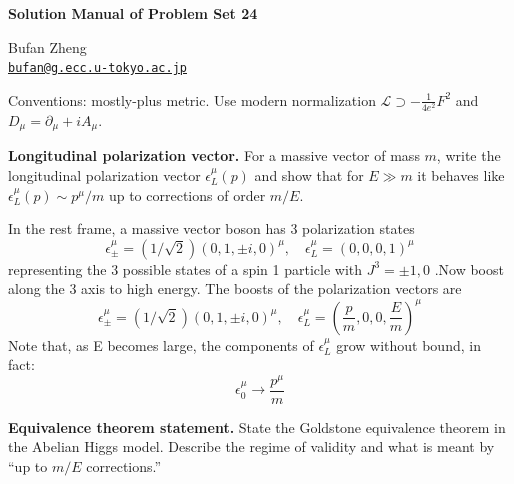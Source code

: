 \resetproblem
\begin{center}
    {\LARGE \textbf{Solution Manual of Problem Set 24} \par}
    \vspace{1em}
    {\large Bufan Zheng\\ \href{mailto:bufan@g.ecc.u-tokyo.ac.jp}{\texttt{bufan@g.ecc.u-tokyo.ac.jp}} \par}
\end{center}

\noindent Conventions: mostly-plus metric. Use modern normalization \(\mathcal{L}\supset-\frac{1}{4e^2}F^2\) and \(D_\mu=\partial_\mu+iA_\mu\).

\begin{problem}
    \textbf{Longitudinal polarization vector.} For a massive vector of mass \(m\), write the longitudinal polarization vector \(\epsilon_L^\mu(p)\) and show that for \(E\gg m\) it behaves like \(\epsilon_L^\mu(p)\sim p^\mu/m\) up to corrections of order \(m/E\).
\end{problem}
\begin{solution}[24.1]
	In the rest frame, a massive vector boson has 3 polarization states
	$$\epsilon_{\pm}^{\mu}=(1/\sqrt{2})(0,1,\pm i,0)^{\mu},\quad\epsilon_{L}^{\mu}=(0,0,0,1)^{\mu}$$
	representing the 3 possible states of a spin 1 particle with $J^3=\pm1,0$ .Now boost along the 3 axis to high energy. The boosts of
	the polarization vectors are
	$$\epsilon_{\pm}^{\mu}=(1/\sqrt{2})(0,1,\pm i,0)^{\mu},\quad\epsilon_L^\mu=(\frac{p}{m},0,0,\frac{E}{m})^\mu$$
	Note that, as E becomes large, the components of $\epsilon^\mu_L$ grow without bound, in fact:
	\[
	\boxed{\epsilon_0^\mu\to\frac{p^\mu}{m}}
	\]
\end{solution}
\begin{problem}
    \textbf{Equivalence theorem statement.} State the Goldstone equivalence theorem in the Abelian Higgs model. Describe the regime of validity and what is meant by “up to \(m/E\) corrections.”
\end{problem}
